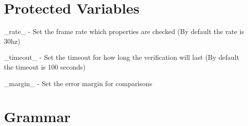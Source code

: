 \section{Protected Variables}

\_rate\_ - Set the frame rate which properties are checked (By default the rate is 30hz)

\_timeout\_ - Set the timeout for how long the verification will last (By default the timeout is 100 seconds)

\_margin\_ - Set the error margin for comparisons

\section{Grammar}

